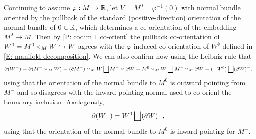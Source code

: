 \begin{example}\label{E: codim 1 pullbacks}
	Continuing to assume $\varphi:M\to \mathbb{R}$, let $V=M^0=\varphi^{-1}(0)$ with normal bundle oriented by the pullback of the standard (positive-direction) orientation of the normal bundle of $0\in \mathbb{R}$, which determines a co-orientation of the embedding $M^0\to M$.
	Then by \cref{P: codim 1 co-orient} the pullback co-orientation of $W^0=M^0\times_M W\hookrightarrow W$ agrees with the $\varphi$-induced co-orientation of $W^0$ defined in \cref{E: manifold decomposition}.
	We can also confirm now using the Leibniz rule that $$\partial(W^-)=\partial(M^- \times_M W)=(\partial M^-)\times_M W \bigsqcup M^-\times \partial W=M^0\times_M W \bigsqcup M^-\times_M \partial W=(-W^0) \bigsqcup (\partial W)^-,$$
	using that the orientation of the normal bundle to $M^0$ is outward pointing from $M^-$ and so disagrees with the inward-pointing normal used to co-orient the boundary inclusion.
	Analogously, $$\partial (W^+)=W^0 \bigsqcup (\partial W)^+,$$
	using that the orientation of the normal bundle to $M^0$ is inward pointing for $M^+$.
\end{example}

\begin{comment}
	\begin{proof}
		Again it is clear that $f\times_Mg=g|_{W^0}$ as maps.
		Suppose given structural co-orientations.
		As $f$ is an embedding, we have $K_f=0$, while $V^\perp$ is spanned by $\nu$; note that as $\nu_0$ maps to $\nu$, we write simply $\nu$ in the local decomposition of $TW$.
		The structural co-orientation of $f$ is $(\beta_{W^\perp}\wedge \beta_I, \beta_{W^\perp}\wedge \beta_I\wedge \beta_\nu)$, which agrees with the assumed co-orientation for $f$.
		So the co-orientation of the pullback will be the structural orientation or not according to whether the structural co-orientation of $g$ agrees with the given co-orientation of $g$ or not.
		The structural co-orientation of $g$ is $(\beta_{K_g}\wedge \beta_I\wedge \beta_\nu, \beta_{W^\perp}\wedge \beta_I\wedge \beta_\nu)$, while the structural co-orientation of the pullback is $(\beta_{K_g}\wedge \beta_I, \beta_{W^\perp}\wedge \beta_I\wedge \beta_\nu)$.
		If the given co-orientation for $g$ agrees with the structural orientation, then the claimed co-orientation for $g|_{W^0}$ is the composition of the structural co-orientation for $g$ with $(\beta_{W^0},\beta_{W^0}\wedge \beta_{\nu})$.
		In this last expression we are free to choose any $\beta_{W^0}$ we like, so we can let $\beta_{W^0}=\beta_{K_g}\wedge \beta_I$.
		Then the claimed composite co-orientation is $(\beta_{K_g}\wedge \beta_I, \beta_{W^\perp}\wedge \beta_I\wedge \beta_\nu)$, which agrees with the pullback co-orientation as claimed.
		If the given co-orientation of $g$ disagrees with the structural co-orientation, this changes the sign of both the pullback co-orientation and of the representative of the co-orientation of $g$ used in our composite but not the sign of $(\beta_{W^0},\beta_{W^0}\wedge \beta_{\nu})$.
		So again the pullback co-orientation agrees with the claimed composite.
	\end{proof}
\end{comment}

